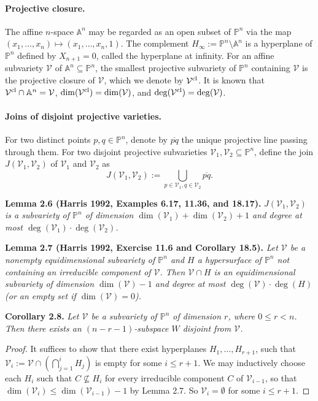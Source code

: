 \documentclass[10pt,a4paper]{article}
\newcommand{\PP}{\mathbb P}
\newcommand{\Aspace}{\mathbb A}
\newenvironment{result}[1]{\par\medskip\noindent\textbf{#1.}\itshape}{\par\medskip}
\begin{document}
\paragraph{Projective closure.}
The affine $n$-space $\Aspace^n$ may be regarded as an open subset of $\PP^n$ via the map $(x_1,\ldots,x_n)\mapsto(x_1,\ldots,x_n,1)$. The complement $H_\infty:=\PP^n\setminus\Aspace^n$ is a hyperplane of $\PP^n$ defined by $X_{n+1}=0$, called the hyperplane at infinity. For an affine subvariety $\mathcal V$ of $\Aspace^n\subseteq\PP^n$, the smallest projective subvariety of $\PP^n$ containing $\mathcal V$ is the projective closure of $\mathcal V$, which we denote by $\mathcal V^{\rm cl}$. It is known that $\mathcal V^{\rm cl}\cap\Aspace^n=\mathcal V$, $\dim(\mathcal V^{\rm cl})=\dim(\mathcal V)$, and $\deg(\mathcal V^{\rm cl})=\deg(\mathcal V)$.
\paragraph{Joins of disjoint projective varieties.}
For two distinct points $p,q\in\PP^n$, denote by $\overline{pq}$ the unique projective line passing through them. For two disjoint projective subvarieties $\mathcal V_1,\mathcal V_2\subseteq\PP^n$, define the join $J(\mathcal V_1,\mathcal V_2)$ of $\mathcal V_1$ and $\mathcal V_2$ as
\[J(\mathcal V_1,\mathcal V_2):=\bigcup_{p\in\mathcal V_1,q\in\mathcal V_2}\overline{pq}.\]
\begin{result}{Lemma 2.6 (Harris 1992, Examples 6.17, 11.36, and 18.17)}
$J(\mathcal V_1,\mathcal V_2)$ is a subvariety of $\PP^n$ of dimension $\dim(\mathcal V_1)+\dim(\mathcal V_2)+1$ and degree at most $\deg(\mathcal V_1)\cdot\deg(\mathcal V_2)$.
\end{result}
\begin{result}{Lemma 2.7 (Harris 1992, Exercise 11.6 and Corollary 18.5)}
Let $\mathcal V$ be a nonempty equidimensional subvariety of $\PP^n$ and $H$ a hypersurface of $\PP^n$ not containing an irreducible component of $\mathcal V$. Then $\mathcal V\cap H$ is an equidimensional subvariety of dimension $\dim(\mathcal V)-1$ and degree at most $\deg(\mathcal V)\cdot\deg(H)$ (or an empty set if $\dim(\mathcal V)=0$).
\end{result}
\begin{result}{Corollary 2.8}
Let $\mathcal V$ be a subvariety of $\PP^n$ of dimension $r$, where $0\le r<n$. Then there exists an $(n-r-1)$-subspace $W$ disjoint from $\mathcal V$.
\end{result}
\begin{proof}
It suffices to show that there exist hyperplanes $H_1,\ldots,H_{r+1}$, such that $\mathcal V_i:=\mathcal V\cap(\bigcap_{j=1}^iH_j)$ is empty for some $i\le r+1$. We may inductively choose each $H_i$ such that $C\not\subseteq H_i$ for every irreducible component $C$ of $\mathcal V_{i-1}$, so that $\dim(\mathcal V_i)\le\dim(\mathcal V_{i-1})-1$ by Lemma 2.7. So $\mathcal V_i=\emptyset$ for some $i\le r+1$.
\end{proof}
\end{document}
